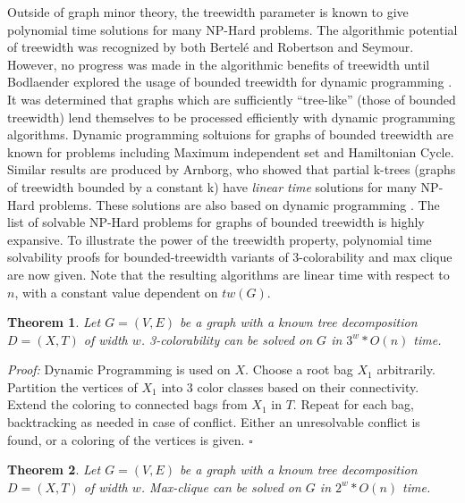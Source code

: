 \documentclass[12pt,conference]{IEEEtran}
\theoremstyle{plain}
\newtheorem{theorem}{Theorem}
\begin{document}
Outside of graph minor theory, the treewidth parameter is known to give polynomial time solutions for many NP-Hard problems. The algorithmic potential of treewidth was recognized by both Bertel\'e and Robertson and Seymour. However, no progress was made in the algorithmic benefits of treewidth until Bodlaender explored the usage of bounded treewidth for dynamic programming \cite{treewidth-dynamic-programming-1988}. It was determined that graphs which are sufficiently ``tree-like'' (those of bounded treewidth) lend themselves to be processed efficiently with dynamic programming algorithms. Dynamic programming soltuions for graphs of bounded treewidth are known for problems including Maximum independent set and Hamiltonian Cycle. Similar results are produced by Arnborg, who showed that partial k-trees (graphs of treewidth bounded by a constant k) have \textit{linear time} solutions for many NP-Hard problems. These solutions are also based on dynamic programming \cite{arnborg-linear-treewidth-algs}. The list of solvable NP-Hard problems for graphs of bounded treewidth is highly expansive. To illustrate the power of the treewidth property, polynomial time solvability proofs for bounded-treewidth variants of 3-colorability and max clique are now given. Note that the resulting algorithms are linear time with respect to $n$, with a constant value dependent on $tw(G)$.

\begin{theorem}
  Let $G=(V,E)$ be a graph with a known tree decomposition $D=(X,T)$ of width $w$. 3-colorability can be solved on $G$ in $3^{w}*O(n)$ time.
\end{theorem}

\textit{Proof:} Dynamic Programming is used on $X$. Choose a root bag $X_{1}$ arbitrarily. Partition the vertices of $X_{1}$ into 3 color classes based on their connectivity. Extend the coloring to connected bags from $X_{1}$ in $T$. Repeat for each bag, backtracking as needed in case of conflict. Either an unresolvable conflict is found, or a coloring of the vertices is given. $\square$

\begin{theorem}
  Let $G=(V,E)$ be a graph with a known tree decomposition $D=(X,T)$ of width $w$. Max-clique can be solved on $G$ in $2^{w}*O(n)$ time.
\end{theorem}
\end{document}
